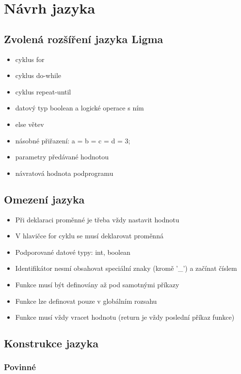 \documentclass[czech, oth, kiv, he, iso690numb, viewonly]{fasthesis}
\begin{document}
    \chapter{Návrh jazyka}

    \section{Zvolená rozšíření jazyka Ligma}
    \begin{itemize}
        \item cyklus for
        \item cyklus do-while
        \item cyklus repeat-until
        \item datový typ boolean a logické operace s ním
        \item else větev
        \item násobné přiřazení: a = b = c = d = 3;
        \item parametry předávané hodnotou
        \item návratová hodnota podprogramu
    \end{itemize}

    \section{Omezení jazyka}
    \begin{itemize}
        \item Při deklaraci proměnné je třeba vždy nastavit hodnotu
        \item V hlavičce for cyklu se musí deklarovat proměnná
        \item Podporované datové typy: int, boolean
        \item Identifikátor nesmí obsahovat speciální znaky (kromě '\_') a začínat číslem
        \item Funkce musí být definovány až pod samotnými příkazy
        \item Funkce lze definovat pouze v globálním rozsahu
        \item Funkce musí vždy vracet hodnotu (return je vždy poslední příkaz funkce)
    \end{itemize}

    \section{Konstrukce jazyka}

    \subsection{Povinné}
\end{document}
